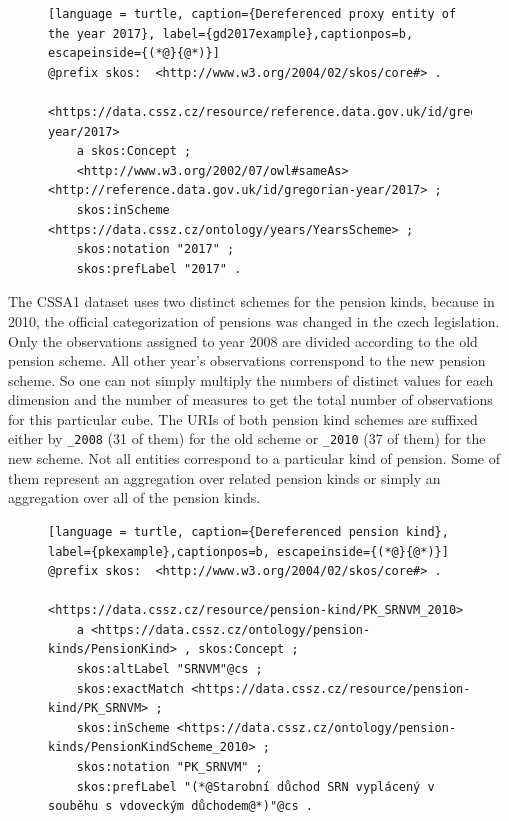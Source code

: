 \begin{figure}[h]
\begin{lstlisting}[language = turtle, caption={Dereferenced proxy entity of the year 2017}, label={gd2017example},captionpos=b, escapeinside={(*@}{@*)}]
@prefix skos:  <http://www.w3.org/2004/02/skos/core#> .

<https://data.cssz.cz/resource/reference.data.gov.uk/id/gregorian-year/2017>
    a skos:Concept ;
    <http://www.w3.org/2002/07/owl#sameAs> <http://reference.data.gov.uk/id/gregorian-year/2017> ;
    skos:inScheme <https://data.cssz.cz/ontology/years/YearsScheme> ;
    skos:notation "2017" ;
    skos:prefLabel "2017" .
\end{lstlisting}
\end{figure}

The CSSA1 dataset uses two distinct schemes for the pension kinds, because in 2010, the official categorization of pensions was changed in the czech legislation. Only the observations assigned to year 2008 are divided according to the old pension scheme. All other year's observations correnspond to the new pension scheme. So one can not simply multiply the numbers of distinct values for each dimension and the number of measures to get the total number of observations for this particular cube. The URIs of both pension kind schemes are suffixed either by \verb|_2008| (31 of them) for the old scheme or \verb|_2010| (37 of them) for the new scheme. Not all entities correspond to a particular kind of pension. Some of them represent an aggregation over related pension kinds or simply an aggregation over all of the pension kinds.

\begin{figure}[h]
\begin{lstlisting}[language = turtle, caption={Dereferenced pension kind}, label={pkexample},captionpos=b, escapeinside={(*@}{@*)}]
@prefix skos:  <http://www.w3.org/2004/02/skos/core#> .

<https://data.cssz.cz/resource/pension-kind/PK_SRNVM_2010>
    a <https://data.cssz.cz/ontology/pension-kinds/PensionKind> , skos:Concept ;
    skos:altLabel "SRNVM"@cs ;
    skos:exactMatch <https://data.cssz.cz/resource/pension-kind/PK_SRNVM> ;
    skos:inScheme <https://data.cssz.cz/ontology/pension-kinds/PensionKindScheme_2010> ;
    skos:notation "PK_SRNVM" ;
    skos:prefLabel "(*@Starobní důchod SRN vyplácený v souběhu s vdoveckým důchodem@*)"@cs .
\end{lstlisting}
\end{figure}

